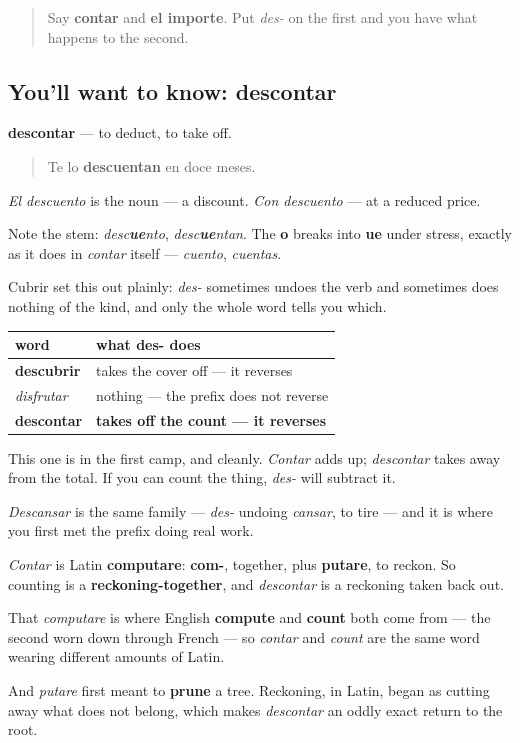 \begin{quote}
Say \textbf{contar} and \textbf{el importe}. Put \emph{des-} on the first and you have what happens to the second.
\end{quote}

\subsection*{You'll want to know: descontar}
\textbf{descontar} — to deduct, to take off.

\begin{quote}
Te lo \textbf{descuentan} en doce meses.
\end{quote}

\emph{El descuento} is the noun — a discount. \emph{Con descuento} — at a reduced price.

Note the stem: \emph{desc\textbf{ue}nto}, \emph{desc\textbf{ue}ntan}. The \textbf{o} breaks into \textbf{ue} under stress, exactly as it does in \emph{contar} itself — \emph{cuento}, \emph{cuentas}.

\begin{grammarlens}[title={Grammar Lens: the des- that reverses, and the one that does not}]
Cubrir set this out plainly: \emph{des-} sometimes undoes the verb and sometimes does nothing of the kind, and only the whole word tells you which.

\noindent
\begin{tabularx}{\linewidth}{@{}>{\raggedright\arraybackslash}X>{\raggedright\arraybackslash}X@{}}
\toprule
\textbf{word} & \textbf{what des- does} \\
\midrule
\textbf{descubrir} & takes the cover off — it reverses \\
\emph{disfrutar} & nothing — the prefix does not reverse \\
\textbf{descontar} & \textbf{takes off the count — it reverses} \\
\bottomrule
\end{tabularx}

This one is in the first camp, and cleanly. \emph{Contar} adds up; \emph{descontar} takes away from the total. If you can count the thing, \emph{des-} will subtract it.

\emph{Descansar} is the same family — \emph{des-} undoing \emph{cansar}, to tire — and it is where you first met the prefix doing real work.
\end{grammarlens}

\begin{cousinweb}
\emph{Contar} is Latin \textbf{computare}: \textbf{com-}, together, plus \textbf{putare}, to reckon. So counting is a \textbf{reckoning-together}, and \emph{descontar} is a reckoning taken back out.

That \emph{computare} is where English \textbf{compute} and \textbf{count} both come from — the second worn down through French — so \emph{contar} and \emph{count} are the same word wearing different amounts of Latin.

And \emph{putare} first meant to \textbf{prune} a tree. Reckoning, in Latin, began as cutting away what does not belong, which makes \emph{descontar} an oddly exact return to the root.
\end{cousinweb}

